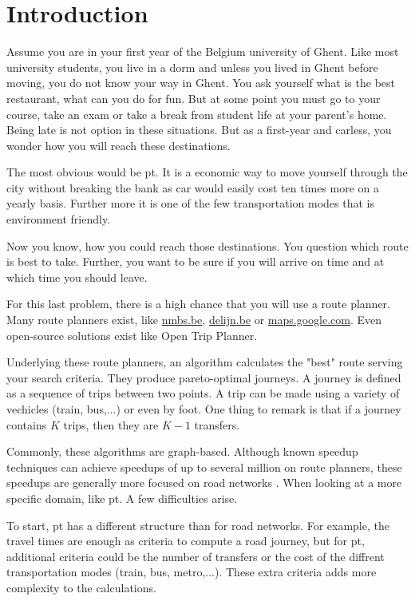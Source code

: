 \chapter{Introduction}
\label{chap:intro}

Assume you are in your first year of the Belgium university of Ghent. Like most university students, you live in a dorm and unless you lived in Ghent before moving, you do not know your way in Ghent. You ask yourself what is the best restaurant, what can you do for fun. But at some point you must go to your course, take an exam or take a break from student life at your parent's home. Being late is not option in these situations. But as a first-year and carless, you wonder how you will reach these destinations.  


The most obvious would be \acrfull{pt}. It is a economic way to move yourself through the city without breaking the bank as car would easily cost ten times more on a yearly basis. Further more it is one of the few transportation modes that is environment friendly.

Now you know, how you could reach those destinations. You question which route is best to take. Further, you want to be sure if you will arrive on time and at which time you should leave. 

For this last problem, there is a high chance that you will use a route planner. Many route planners exist, like \url{nmbs.be}, \url{delijn.be} or \url{maps.google.com}. Even open-source solutions exist like Open Trip Planner\cite{raptorinopentripplanner}.

Underlying these route planners, an algorithm calculates the "best" route serving your search criteria. They produce pareto-optimal journeys. A journey is defined as a sequence of trips between two points. A trip can be made using a variety of vechicles (train, bus,...) or even by foot. One thing to remark is that if a journey contains $K$ trips, then they are $K-1$ transfers. %

Commonly, these algorithms are graph-based. Although known speedup techniques can achieve speedups of up to several million on route planners, these speedups are generally more focused on road networks \cite{raptor}. When looking at a more specific domain, like \acrshort{pt}. A few difficulties arise.

To start, \acrshort{pt} has a different structure than for road networks. For example, the travel times are enough as criteria to compute a road journey, but for \acrshort{pt}, additional criteria could be the number of transfers or the cost of the diffrent transportation modes (train, bus, metro,...). These extra criteria adds more complexity to the calculations.

